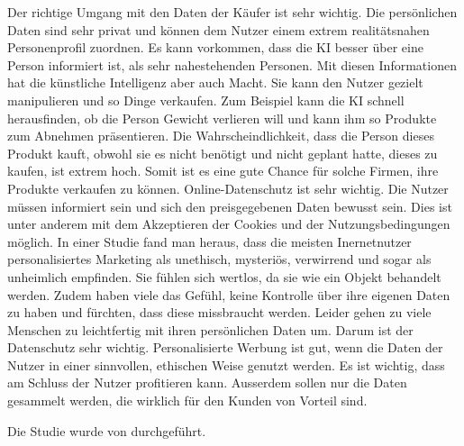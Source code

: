 \documentclass{article}
\begin{document}
Der richtige Umgang mit den Daten der Käufer ist sehr wichtig. Die persönlichen Daten sind sehr privat und können dem Nutzer einem extrem realitätsnahen Personenprofil zuordnen. Es kann vorkommen, dass die KI besser über eine Person informiert ist, als sehr nahestehenden Personen. Mit diesen Informationen hat die künstliche Intelligenz aber auch Macht. Sie kann den Nutzer gezielt manipulieren und so Dinge verkaufen. Zum Beispiel kann die KI schnell herausfinden, ob die Person Gewicht verlieren will und kann ihm so Produkte zum Abnehmen präsentieren. Die Wahrscheindlichkeit, dass die Person dieses Produkt kauft, obwohl sie es nicht benötigt und nicht geplant hatte, dieses zu kaufen, ist extrem hoch. Somit ist es eine gute Chance für solche Firmen, ihre Produkte verkaufen zu können. Online-Datenschutz ist sehr wichtig. Die Nutzer müssen informiert sein und sich den preisgegebenen Daten bewusst sein. Dies ist unter anderem mit dem Akzeptieren der Cookies und der Nutzungsbedingungen möglich. In einer Studie fand man heraus, dass die meisten Inernetnutzer personalisiertes Marketing als unethisch, mysteriös, verwirrend und sogar als unheimlich empfinden. Sie fühlen sich wertlos, da sie wie ein Objekt behandelt werden. Zudem haben viele das Gefühl, keine Kontrolle über ihre eigenen Daten zu haben und fürchten, dass diese missbraucht werden. Leider gehen zu viele Menschen zu leichtfertig mit ihren persönlichen Daten um. Darum ist der Datenschutz sehr wichtig. 
Personalisierte Werbung ist gut, wenn die Daten der Nutzer in einer sinnvollen, ethischen Weise genutzt werden. Es ist wichtig, dass am Schluss der Nutzer profitieren kann. Ausserdem sollen nur die Daten gesammelt werden, die wirklich für den Kunden von Vorteil sind. 

Die Studie wurde von \citep{Basicthinking} durchgeführt. 

\printbibliography

\nocite{*}
\end{document}
